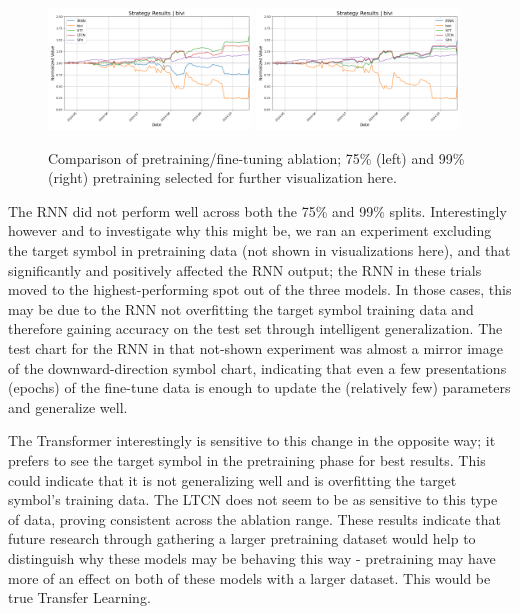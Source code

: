 \documentclass[10pt,twocolumn,letterpaper]{article}
\begin{document}
\begin{figure}[ht!]
    \centering
    \includegraphics[width=0.48\textwidth]{../figures/simulation_results_all_models_bivi_config_target_split_75.yml.png}
    \includegraphics[width=0.48\textwidth]{../figures/simulation_results_all_models_bivi_config_target_split_99.yml.png} 
    \caption{Comparison of pretraining/fine-tuning ablation; 75\% (left) and 99\% (right) pretraining selected for further visualization here.}
    \label{fig:pretrainingsplits}
\end{figure}

The RNN did not perform well across both the 75\% and 99\% splits. Interestingly however and to investigate why this might be, we ran an experiment excluding the target symbol in pretraining data (not shown in visualizations here), and that significantly and positively affected the RNN output; the RNN in these trials moved to the highest-performing spot out of the three models. In those cases, this may be due to the RNN not overfitting the target symbol training data and therefore gaining accuracy on the test set through intelligent generalization. The test chart for the RNN in that not-shown experiment was almost a mirror image of the downward-direction symbol chart, indicating that even a few presentations (epochs) of the fine-tune data is enough to update the (relatively few) parameters and generalize well. 

The Transformer interestingly is sensitive to this change in the opposite way; it prefers to see the target symbol in the pretraining phase for best results. This could indicate that it is not generalizing well and is overfitting the target symbol's training data. The LTCN does not seem to be as sensitive to this type of data, proving consistent across the ablation range. These results indicate that future research through gathering a larger pretraining dataset would help to distinguish why these models may be behaving this way - pretraining may have more of an effect on both of these models with a larger dataset. This would be true Transfer Learning.
\end{document}
